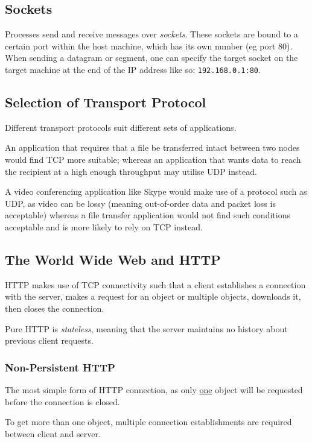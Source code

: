 \documentclass{article}
\begin{document}
\subsection{Sockets}

Processes send and receive messages over \textit{sockets}. These sockets are bound to a certain port within the host machine, which has its own number (eg port 80). When sending a datagram or segment, one can specify the target socket on the target machine at the end of the IP address like so: \texttt{192.168.0.1:80}. 

\subsection{Selection of Transport Protocol}

Different transport protocols suit different sets of applications. 

An application that requires that a file be transferred intact between two nodes would find TCP more suitable; whereas an application that wants data to reach the recipient at a high enough throughput may utilise UDP instead.

A video conferencing application like Skype would make use of a protocol such as UDP, as video can be lossy (meaning out-of-order data and packet loss is acceptable) whereas a file transfer application would not find such conditions acceptable and is more likely to rely on TCP instead.

\subsection{The World Wide Web and HTTP}

HTTP makes use of TCP connectivity such that a client establishes a connection with the server, makes a request for an object or multiple objects, downloads it, then closes the connection.

Pure HTTP is \textit{stateless}, meaning that the server maintains no history about previous client requests.

\subsubsection{Non-Persistent HTTP}

The most simple form of HTTP connection, as only \underline{one} object will be requested before the connection is closed.

To get more than one object, multiple connection establishments are required between client and server.
\end{document}
